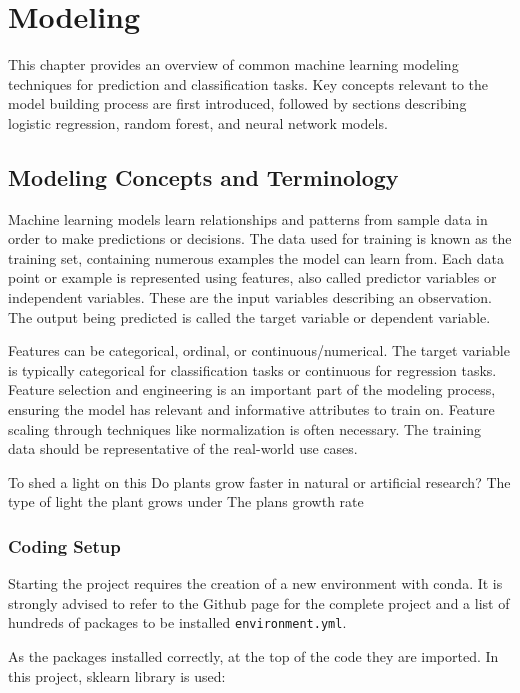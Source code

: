 %
\chapter{Modeling}
\label{sec:model}
This chapter provides an overview of common machine learning modeling techniques for prediction and classification tasks. Key concepts relevant to the model building process are first introduced, followed by sections describing logistic regression, random forest, and neural network models.

\section{Modeling Concepts and Terminology}

Machine learning models learn relationships and patterns from sample data in order to make predictions or decisions. The data used for training is known as the training set, containing numerous examples the model can learn from. Each data point or example is represented using features, also called predictor variables or independent variables. These are the input variables describing an observation. The output being predicted is called the target variable or dependent variable.

Features can be categorical, ordinal, or continuous/numerical. The target variable is typically categorical for classification tasks or continuous for regression tasks. Feature selection and engineering is an important part of the modeling process, ensuring the model has relevant and informative attributes to train on. Feature scaling through techniques like normalization is often necessary. The training data should be representative of the real-world use cases.


To shed a light on this
Do plants grow faster in natural or artificial research?	The type of light the plant grows under	The plans growth rate

\subsection{Coding Setup}

Starting the project requires the creation of a new environment with conda. It is strongly advised to refer to the Github page \cite{karimi2023github} for the complete project and a list of hundreds of packages to be installed \texttt{environment.yml}.

As the packages installed correctly, at the top of the code they are imported. In this project, sklearn library is used:


